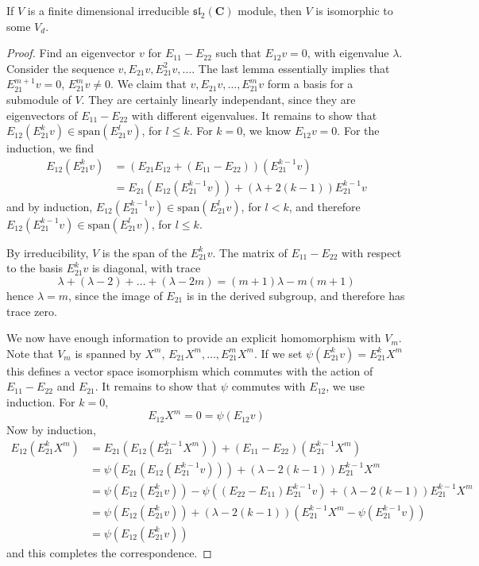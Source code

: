 \begin{theorem}
    If $V$ is a finite dimensional irreducible $\mathfrak{sl}_2(\mathbf{C})$ module, then $V$ is isomorphic to some $V_d$.
\end{theorem}
\begin{proof}
    Find an eigenvector $v$ for $E_{11} - E_{22}$ such that $E_{12} v = 0$, with eigenvalue $\lambda$. Consider the sequence $v, E_{21} v, E_{21}^2 v, \dots$. The last lemma essentially implies that $E_{21}^{m+1} v = 0$, $E_{21}^m v \neq 0$. We claim that $v, E_{21} v, \dots, E_{21}^m v$ form a basis for a submodule of $V$. They are certainly linearly independant, since they are eigenvectors of $E_{11} - E_{22}$ with different eigenvalues. It remains to show that $E_{12}(E_{21}^k v) \in \text{span}(E_{21}^l v)$, for $l \leq k$. For $k = 0$, we know $E_{12} v = 0$. For the induction, we find
    \begin{align*}
        E_{12}(E_{21}^k v) &= (E_{21} E_{12} + (E_{11} - E_{22})) (E_{21}^{k-1} v)\\
        &= E_{21}(E_{12}(E_{21}^{k-1} v)) + (\lambda + 2(k-1)) E_{21}^{k-1} v
    \end{align*}
    and by induction, $E_{12}(E_{21}^{k-1} v) \in \text{span}(E_{21}^l v)$, for $l < k$, and therefore $E_{12}(E_{21}^{k-1} v) \in \text{span}(E_{21}^l v)$, for $l \leq k$.

    By irreducibility, $V$ is the span of the $E_{21}^k v$. The matrix of $E_{11} - E_{22}$ with respect to the basis $E_{21}^k v$ is diagonal, with trace
    \[ \lambda + (\lambda - 2) + \dots + (\lambda - 2m) = (m+1) \lambda - m(m+1) \]
    hence $\lambda = m$, since the image of $E_{21}$ is in the derived subgroup, and therefore has trace zero.

    We now have enough information to provide an explicit homomorphism with $V_m$. Note that $V_m$ is spanned by $X^m$, $E_{21} X^m, \dots, E_{21}^m X^m$. If we set $\psi(E_{21}^k v) = E_{21}^k X^m$ this defines a vector space isomorphism which commutes with the action of $E_{11} - E_{22}$ and $E_{21}$. It remains to show that $\psi$ commutes with $E_{12}$, we use induction. For $k = 0$,
    \[ E_{12}X^m = 0 = \psi(E_{12} v) \]
    Now by induction,
    \begin{align*}
        E_{12}(E_{21}^k X^m) &= E_{21}(E_{12}(E_{21}^{k-1} X^m)) + (E_{11} - E_{22})(E_{21}^{k-1} X^m)\\
        &= \psi(E_{21}(E_{12}(E_{21}^{k-1} v))) + (\lambda - 2(k-1)) E_{21}^{k-1} X^m \\
        &= \psi(E_{12}(E_{21}^k v)) - \psi((E_{22} - E_{11}) E_{21}^{k-1} v) + (\lambda - 2(k-1)) E_{21}^{k-1} X^m\\
        &= \psi(E_{12}(E_{21}^k v)) + (\lambda - 2(k-1))(E_{21}^{k-1} X^m - \psi(E_{21}^{k-1} v))\\
        &= \psi(E_{12}(E_{21}^k v))
    \end{align*}
    and this completes the correspondence.
\end{proof}

